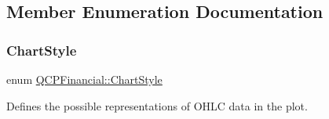 \subsection{Member Enumeration Documentation}
\mbox{\label{class_q_c_p_financial_a0f800e21ee98d646dfc6f8f89d10ebfb}} 
\subsubsection{\texorpdfstring{Chart\+Style}{ChartStyle}\hspace{0.1cm}{\footnotesize\ttfamily [1/2]}}
{\footnotesize\ttfamily enum \hyperlink{class_q_c_p_financial_a0f800e21ee98d646dfc6f8f89d10ebfb}{Q\+C\+P\+Financial\+::\+Chart\+Style}}

Defines the possible representations of O\+H\+LC data in the plot.

